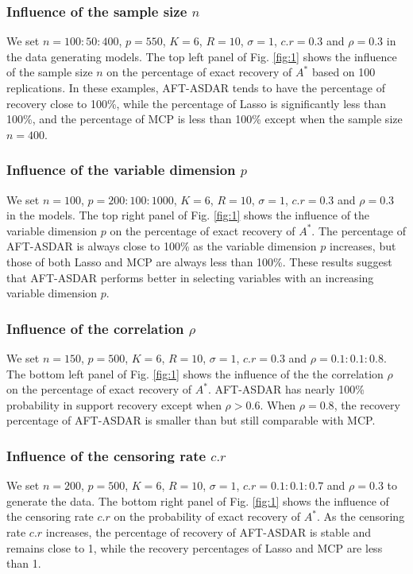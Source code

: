 \documentclass[12pt]{article}
\begin{document}
\subsubsection{Influence of the sample size $n$}
\label{sec:9}
We set $n=100:50:400$, $p=550$, $K=6$, $R=10$, $\sigma=1$, $c.r=0.3$ and $\rho=0.3$ in the data generating models.
The top left panel of Fig. \ref{fig:1} shows the influence of the sample size $n$ on the percentage of exact recovery of $A^*$ based
on 100 replications.
In these examples,
AFT-ASDAR tends to have the percentage of recovery close to 100\%, while the percentage of Lasso is significantly less than 100\%, and the percentage of MCP is less than 100\% except when the sample size $n=400$.
\subsubsection{ Influence of the variable dimension $p$}
\label{sec:10}
We set $n=100$, $p=200:100:1000$, $K=6$, $R=10$, $\sigma=1$, $c.r=0.3$ and $\rho=0.3$ in the models.
The top right panel of Fig. \ref{fig:1} shows the influence of the variable dimension  $p$ on the percentage of exact recovery of $A^*$.
The percentage of AFT-ASDAR is always close to 100\% as the variable dimension $p$ increases, but those of both Lasso and MCP are always less than 100\%. These results suggest that AFT-ASDAR performs better in selecting variables with an increasing variable dimension $p$.
\subsubsection{Influence of the correlation $\rho$}
\label{sec:11}
We set $n=150$, $p=500$, $K=6$, $R=10$, $\sigma=1$, $c.r=0.3$ and $\rho=0.1:0.1:0.8$. The bottom left panel of Fig. \ref{fig:1} shows the influence of the the correlation $\rho$ on the percentage of exact recovery of $A^*$.
AFT-ASDAR has nearly 100\% probability in support recovery except when $\rho>0.6$.
When  $\rho=0.8$, the recovery percentage of
AFT-ASDAR is smaller than but still comparable with MCP.
\subsubsection{Influence of the censoring rate $c.r$}
\label{sec:12}
 We set $n=200$, $p=500$, $K=6$, $R=10$, $\sigma=1$, $c.r=0.1:0.1:0.7$
and $\rho=0.3$ to generate the data.
The bottom right panel of Fig. \ref{fig:1} shows the influence of  the censoring rate $c.r$ on the probability of exact recovery of $A^*$.
As the censoring rate $c.r$ increases, the percentage of recovery  of AFT-ASDAR is stable and remains close to 1, while the recovery percentages  of Lasso and MCP are less than 1.
\end{document}
